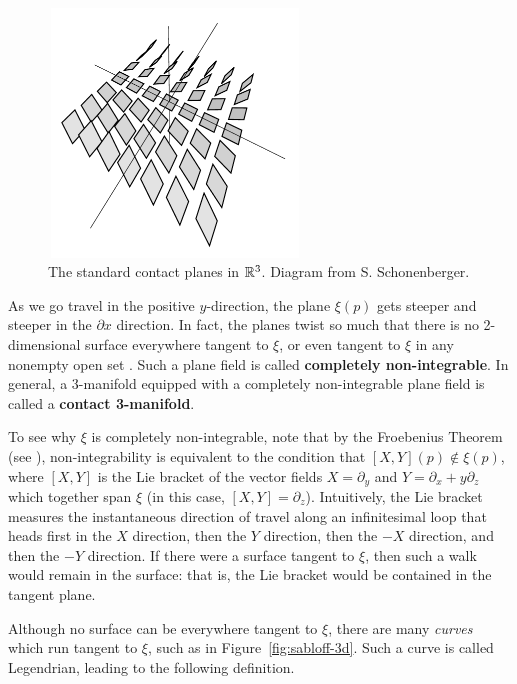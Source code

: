 \begin{figure}[ht]
    \centering
    \includegraphics[width=0.6\textwidth, height=2.6in]{images/contact-planes.pdf}
    \caption{The standard contact planes in $\mathbb{R}^3$. Diagram from S. Schonenberger.}%
    \label{fig:contact-planes}
\end{figure}

As we go travel in the positive $y$-direction, the plane $\xi(p)$  gets steeper and steeper in the $\partial x$ direction. In fact, the planes twist so much that there is no 2-dimensional surface everywhere tangent to $\xi$, or even tangent to $\xi$ in any nonempty open set \cite{boothby}.
Such a plane field is called \textbf{completely non-integrable}.
In general, a 3-manifold equipped with a completely non-integrable plane field is called a \textbf{contact 3-manifold}.

To see why $\xi$ is completely non-integrable, note that by the Froebenius Theorem (see \cite{boothby}), non-integrability is equivalent to the condition that $[X, Y](p) \not\in \xi(p)$, where $[X, Y]$ is the Lie bracket of the vector fields $X = \partial_y$ and $Y = \partial_x + y\partial_z$ which together span $\xi$ (in this case, $[X, Y] = \partial_z$). Intuitively, the Lie bracket measures the instantaneous direction of travel along an infinitesimal loop that heads first in the $X$ direction, then the $Y$ direction, then the $-X$ direction, and then the $-Y$ direction. If there were a surface tangent to $\xi$, then such a walk would remain in the surface: that is, the Lie bracket would be contained in the tangent plane.

Although no surface can be everywhere tangent to $\xi$, there are many \emph{curves} which run tangent to $\xi$, such as in Figure~\ref{fig:sabloff-3d}. Such a curve is called Legendrian, leading to the following definition. 

